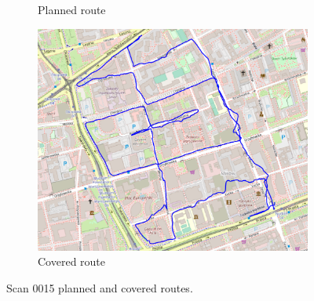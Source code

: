 \documentclass[a4paper,12pt]{book}
\begin{document}
\begin{enumerate}
\begin{figure}[H]
\begin{subfigure}{.85\textwidth}
			\caption{Planned route}
			\label{fig:a15}
		\end{subfigure}%
		\linebreak
		\begin{subfigure}{.85\textwidth}
			\centering
			\includegraphics[width=1\linewidth]{route_c15}
			\caption{Covered route}
			\label{fig:b15}
		\end{subfigure}
		\caption{Scan 0015 planned and covered routes.}
		\label{fig:fig15}
	\end{figure} 
	\pagebreak
	

\end{enumerate}
\end{document}
